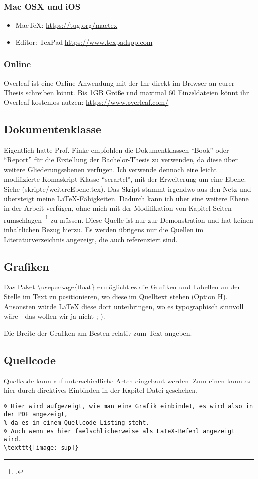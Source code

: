 \subsubsection{Mac OSX und iOS}
\begin{itemize}
\item MacTeX: \url{https://tug.org/mactex}
\item Editor: TexPad \url{https://www.texpadapp.com}
\end{itemize}

\subsubsection{Online}
Overleaf ist eine Online-Anwendung mit der Ihr direkt im Browser an eurer Thesis schreiben könnt. Bis 1GB Größe und maximal 60 Einzeldateien könnt ihr Overleaf kostenlos nutzen: \url{https://www.overleaf.com/}


\subsection{Dokumentenklasse}
Eigentlich hatte Prof. Finke empfohlen die Dokumentklassen \enquote{Book} oder \enquote{Report} für die Erstellung der Bachelor-Thesis zu verwenden, da diese über weitere Gliederungsebenen verfügen. Ich verwende dennoch eine leicht modifizierte Komaskript-Klasse \enquote{scrartcl}, mit der Erweiterung um eine Ebene. Siehe (skripte/weitereEbene.tex). Das Skript stammt irgendwo aus den Netz und übersteigt meine \LaTeX{}-Fähigkeiten. Dadurch kann ich über eine weitere Ebene in der Arbeit verfügen, ohne mich mit der Modifikation von Kapitel-Seiten rumschlagen~\footcite[Vgl. ][S. 5]{Tanenbaum.2003} zu müssen. Diese Quelle ist nur zur Demonstration und hat keinen inhaltlichen Bezug hierzu. Es werden übrigens nur die Quellen im Literaturverzeichnis angezeigt, die auch referenziert sind.


\subsection{Grafiken}
Das Paket \textbackslash usepackage\{float\} ermöglicht es die Grafiken und Tabellen an der Stelle im Text zu positionieren, wo diese im Quelltext stehen (Option H). Ansonsten würde \LaTeX{} diese dort unterbringen, wo es typographisch sinnvoll wäre - das wollen wir ja nicht ;-).

Die Breite der Grafiken am Besten relativ zum Text angeben.

\subsection{Quellcode}
Quellcode kann auf unterschiedliche Arten eingebaut werden.
Zum einen kann es hier durch direktives Einbinden in der Kapitel-Datei geschehen.
\begin{lstlisting}
% Hier wird aufgezeigt, wie man eine Grafik einbindet, es wird also in der PDF angezeigt,
% da es in einem Quellcode-Listing steht.
% Auch wenn es hier faelschlicherweise als LaTeX-Befehl angezeigt wird.
\texttt{[image: sup]}
\end{lstlisting}


